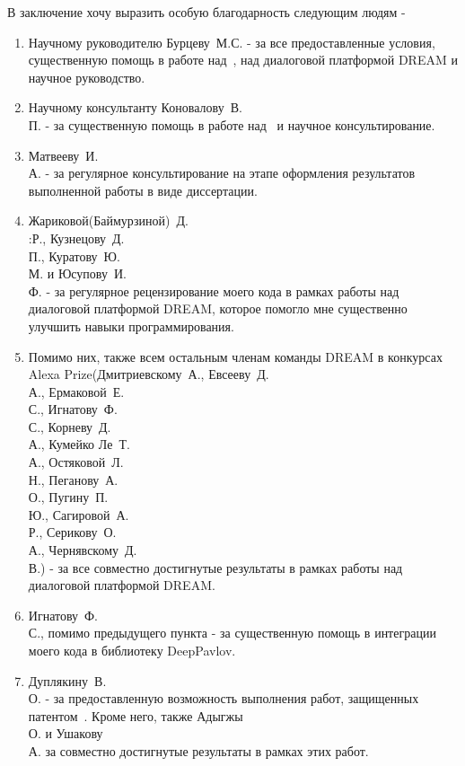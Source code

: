 В заключение хочу выразить особую благодарность следующим людям - 
\begin{enumerate}
\item Научному руководителю Бурцеву~М.\:С. - за все предоставленные условия, существенную помощь в работе над~\cite{dream1,dream1_trudy,dream2,pseudolabel}, над диалоговой платформой DREAM и научное руководство.
\item Научному консультанту Коновалову~В.\\П. - за существенную помощь в работе над~\cite{rumtl,rutopics,enmtl,dp_2023} и научное консультирование.
\item Матвееву~И.\\А. - за регулярное консультирование на этапе оформления результатов выполненной работы в виде диссертации.
\item Жариковой(Баймурзиной)~Д.\\:Р., Кузнецову~Д.\\П., Куратову~Ю.\\М. и Юсупову~И.\\Ф. - за регулярное рецензирование моего кода в рамках работы над диалоговой платформой DREAM, которое помогло мне существенно улучшить навыки программирования. 
\item Помимо них, также всем остальным членам команды DREAM в конкурсах Alexa Prize(Дмитриевскому~А., Евсееву~Д.\\А., Ермаковой~Е.\\С., Игнатову~Ф.\\С., Корневу~Д.\\А., Кумейко Ле~Т.\\А., Остяковой~Л.\\Н., Пеганову~А.\\О., Пугину~П.\\Ю., Сагировой~А.\\Р., Серикову~О.\\А., Чернявскому~Д.\\В.) - за все совместно достигнутые результаты в рамках работы над диалоговой платформой DREAM. 
\item Игнатову~Ф.\\С., помимо предыдущего пункта - за существенную помощь в интеграции моего кода в библиотеку DeepPavlov.
\item Дуплякину~В.\\О. - за предоставленную возможность выполнения работ, защищенных патентом~\cite{Дуплякин_Дмитрий_Ондар_Ушаков_2021}. Кроме него, также Адыгжы~\\О. и Ушакову~\\А. за совместно достигнутые результаты в рамках этих работ. 

\end{enumerate}
